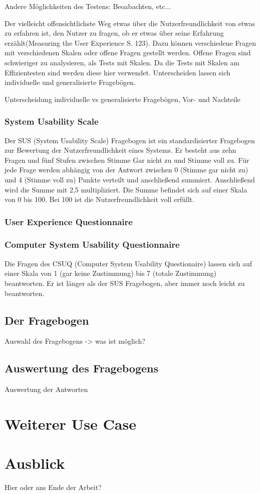 Andere Möglichkeiten des Testens: Beoabachten, etc...

\glqq Der vielleicht offensichtlichste Weg etwas über die Nutzerfreundlichkeit von etwas zu erfahren ist, den Nutzer zu fragen, ob er etwas über seine Erfahrung erzählt\grqq(Measuring the User Experience S. 123). Dazu können verschiedene Fragen mit verschiedenen Skalen oder offene Fragen gestellt werden. Offene Fragen sind schwieriger zu analysieren, als Tests mit Skalen. Da die Tests mit Skalen am Effizientesten sind werden diese hier verwendet. Unterscheiden lassen sich individuelle und generalisierte Fragebögen.

Unterscheidung individuelle vs generalisierte Fragebögen, Vor- und Nachteile

\subsubsection*{System Usability Scale}
Der SUS (System Usability Scale) Fragebogen ist ein standardisierter Fragebogen zur Bewertung der Nutzerfreundlichkeit eines Systems. Er besteht aus zehn Fragen und fünf Stufen zwischen Stimme Gar nicht zu und Stimme voll zu. Für jede Frage werden abhängig von der Antwort zwischen 0 (Stimme gar nicht zu) und 4 (Stimme voll zu) Punkte verteilt und anschließend summiert. Anschließend wird die Summe mit 2,5 multipliziert. Die Summe befindet sich auf einer Skala von 0 bis 100. Bei 100 ist die Nutzerfreundlichkeit voll erfüllt.

\subsubsection*{User Experience Questionnaire}

\subsubsection*{Computer System Usability Questionnaire}
Die Fragen des CSUQ (Computer System Usability Questionaire) lassen sich auf einer Skala von 1 (gar keine Zustimmung) bis 7 (totale Zustimmung) beantworten. Er ist länger als der SUS Fragebogen, aber immer noch leicht zu beantworten.

\subsection{Der Fragebogen}
Auswahl des Fragebogens -> was ist möglich?

\subsection{Auswertung des Fragebogens}
Auswertung der Antworten

\section{Weiterer Use Case}

\section{Ausblick}
Hier oder ans Ende der Arbeit?
